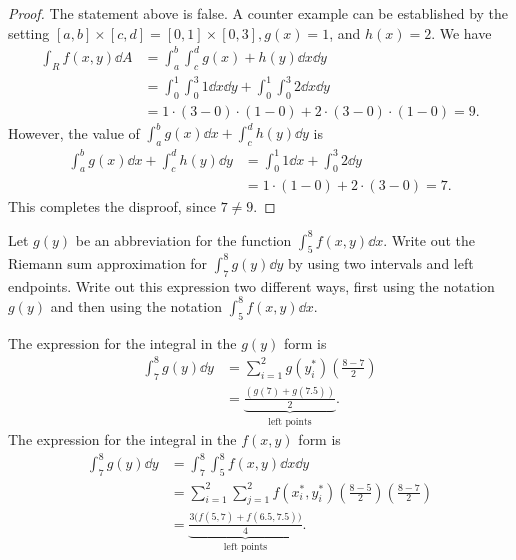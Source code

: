 \documentclass[8pt,twocolumn]{article}
\begin{document}
\begin{Answer}[number=11]
\begin{proof}
  The statement above is false. A counter example can be established by the
  setting  $[a,b]\times[c,d]=[0,1]\times[0,3], g(x) = 1$, and $h(x)=2$. We
  have
  \begin{align*}
    \int_R f(x,y)\dd{A} &= \int_a^b\int_c^dg(x) +  h(y)\dd{x}\dd{y} \\
    &= \int_0^1\int_0^3 1 \dd{x}\dd{y} + \int_0^1\int_0^3 2 \dd{x}\dd{y} \\
    &= 1\cdot(3-0)\cdot(1-0) + 2\cdot(3-0)\cdot(1-0) = 9.
  \end{align*}
  However, the value of $\int_a^bg(x)\dd{x} +  \int_c^dh(y)\dd{y}$ is
  \begin{align*}
    \int_a^bg(x)\dd{x} +  \int_c^dh(y)\dd{y}
    &= \int_0^1 1\dd{x} + \int_0^3 2\dd{y} \\
    &= 1\cdot(1-0) + 2\cdot(3-0) = 7.
  \end{align*}
  This completes the disproof, since $7\ne9$.
\end{proof}
\end{Answer}

\begin{Exercise}[number=12]
  Let $g(y)$ be an abbreviation for the function $\int_5^8f(x,y)\dd{x}$. Write
  out the Riemann sum approximation for $\int_7^8 g(y)\dd{y}$ by using two
  intervals and left endpoints. Write out this expression two different ways,
  first using the notation $g(y)$ and then using the notation
  $\int_5^8f(x,y)\dd{x}$.
\end{Exercise}

\begin{Answer}[number=12]
  The expression for the integral in the $g(y)$ form is
  \begin{align*}
    \int_7^8 g(y) \dd{y} &= \sum_{i=1}^2g(y_i^*)(\frac{8-7}{2}) \\
    &=\underbrace{\frac{(g(7)+g(7.5))}{2}}_\text{left points}.
  \end{align*}
  The expression for the integral in the $f(x,y)$ form is
  \begin{align*}
    \int_7^8 g(y) \dd{y} &= \int_7^8\int_5^8f(x,y)\dd{x}\dd{y} \\
    &= \sum_{i=1}^2\sum_{j=1}^2f(x_i^*,y_i^*)(\frac{8-5}{2})(\frac{8-7}{2}) \\
    &= \underbrace{\frac{3\big(f(5,7)+f(6.5,7.5)\big)}{4}}_\text{left
    points}.
  \end{align*}
\end{Answer}
\end{document}

